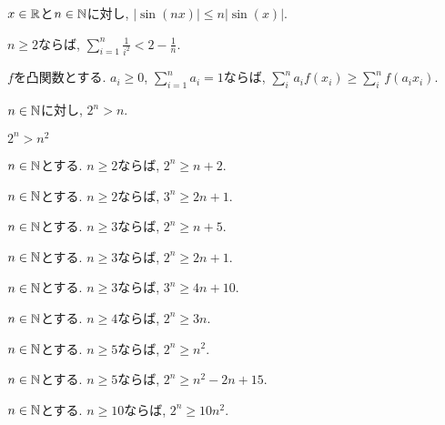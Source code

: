 \begin{prop}
$x\in\mathbb{R}$と$n\in\mathbb{N}$に対し, $|\sin(nx)|\leq n|\sin(x)|$.
\end{prop}

\begin{prop}
  $n\geq 2$ならば,
  $\sum_{i=1}^{n}\frac{1}{i^2}<2-\frac{1}{n}$.
\end{prop}

\begin{prop}
  $f$を凸関数とする.
  $a_i\geq 0$, $\sum_{i=1}^n a_i=1$ならば,
  $\sum_{i}^{n} a_i f(x_i)\geq \sum_{i}^{n}  f(a_i x_i)$.
\end{prop}


\begin{prop}
$n\in\mathbb{N}$に対し, $2^n> n$.
\end{prop}

\begin{prop}
  $2^n>n^2$
\end{prop}

\begin{prop}
$n\in\mathbb{N}$とする.
  $n\geq 2$ならば, $2^n \geq n+2$.
\end{prop}

\begin{prop}
$n\in\mathbb{N}$とする.
  $n\geq 2$ならば, $3^n \geq 2n+1$.
\end{prop}


\begin{prop}
$n\in\mathbb{N}$とする.
  $n\geq 3$ならば, $2^n\geq n+5$.
\end{prop}

\begin{prop}
$n\in\mathbb{N}$とする.
  $n\geq 3$ならば, $2^n\geq 2n+1$.
\end{prop}

\begin{prop}
$n\in\mathbb{N}$とする.
  $n\geq 3$ならば, $3^n\geq 4n+10$.
\end{prop}

\begin{prop}
$n\in\mathbb{N}$とする.
  $n\geq 4$ならば, $2^n\geq 3n$.
\end{prop}


\begin{prop}
$n\in\mathbb{N}$とする.
  $n\geq 5$ならば, $2^n\geq n^2$.
\end{prop}

\begin{prop}
$n\in\mathbb{N}$とする.
  $n\geq 5$ならば, $2^n\geq n^2-2n+15$.
\end{prop}


\begin{prop}
$n\in\mathbb{N}$とする.
  $n\geq 10$ならば, $2^n\geq 10n^2$.
\end{prop}

